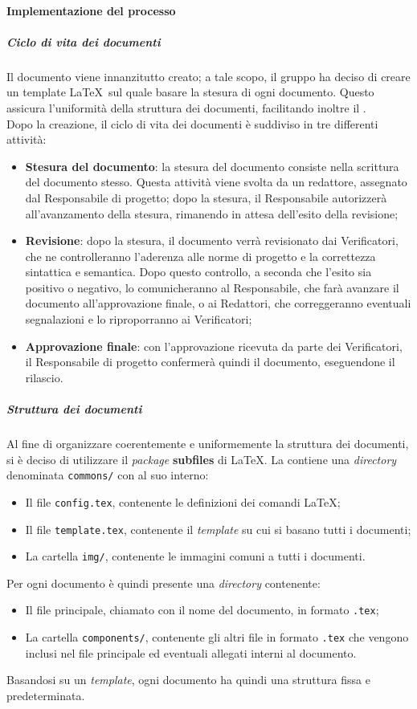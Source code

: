 \documentclass[../norme-di-progetto.tex]{subfiles}
\begin{document}
\paragraph{Implementazione del processo}
\subparagraph{Ciclo di vita dei documenti}
Il documento viene innanzitutto creato; a tale scopo, il gruppo ha deciso di creare un template \LaTeX\ sul quale basare la stesura di ogni documento. Questo assicura l'uniformità della struttura dei documenti, facilitando inoltre il . \\
Dopo la creazione, il ciclo di vita dei documenti è suddiviso in tre differenti attività:
\begin{itemize}
  \item \textbf{Stesura del documento}: la stesura del documento consiste nella scrittura del documento stesso. Questa attività viene svolta da un redattore, assegnato dal Responsabile di progetto; dopo la stesura, il Responsabile autorizzerà all'avanzamento della stesura, rimanendo in attesa dell'esito della revisione;
  \item \textbf{Revisione}: dopo la stesura, il documento verrà revisionato dai Verificatori, che ne controlleranno l'aderenza alle norme di progetto e la correttezza sintattica e semantica. Dopo questo controllo, a seconda che l'esito sia positivo o negativo, lo comunicheranno al Responsabile, che farà avanzare il documento all'approvazione finale, o ai Redattori, che correggeranno eventuali segnalazioni e lo riproporranno ai Verificatori;
  \item \textbf{Approvazione finale}: con l'approvazione ricevuta da parte dei Verificatori, il Responsabile di progetto confermerà quindi il documento, eseguendone il rilascio.
\end{itemize}

\subparagraph{Struttura dei documenti}
Al fine di organizzare coerentemente e uniformemente la struttura dei documenti, si è deciso di utilizzare il \textit{package} \textbf{subfiles} di \LaTeX. La  contiene una \textit{directory} denominata \texttt{commons/} con al suo interno:
\begin{itemize}
  \item Il file \texttt{config.tex}, contenente le definizioni dei comandi \LaTeX;
  \item Il file \texttt{template.tex}, contenente il \textit{template} su cui si basano tutti i documenti;
  \item La cartella \texttt{img/}, contenente le immagini comuni a tutti i documenti.
\end{itemize}
Per ogni documento è quindi presente una \textit{directory} contenente:
\begin{itemize}
  \item  Il file principale, chiamato con il nome del documento, in formato \texttt{.tex};
  \item La cartella \texttt{components/}, contenente gli altri file in formato \texttt{.tex} che vengono inclusi nel file principale ed eventuali allegati interni al documento.
\end{itemize}
Basandosi su un \textit{template}, ogni documento ha quindi una struttura fissa e predeterminata.
\end{document}
